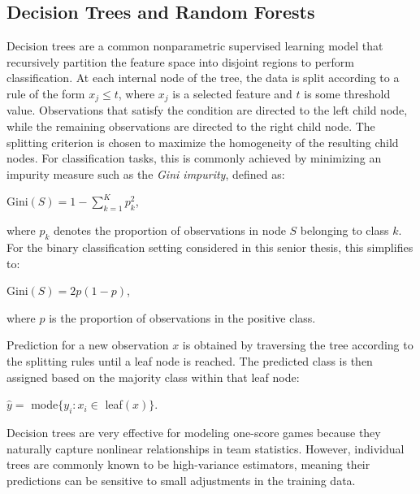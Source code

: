 \documentclass[11pt]{amsart}
\theoremstyle{definition}                  %
\theoremstyle{remark}                       %
\numberwithin{equation}{section}
\begin{document}
\subsection{Decision Trees and Random Forests}
Decision trees are a common nonparametric supervised learning model that recursively partition the feature space into disjoint regions to perform classification. At each internal node of the tree, the data is split according to a rule of the form $x_j \leq t$, where $x_j$ is a selected feature and $t$ is some threshold value. Observations that satisfy the condition are directed to the left child node, while the remaining observations are directed to the right child node. The splitting criterion is chosen to maximize the homogeneity of the resulting child nodes. For classification tasks, this is commonly achieved by minimizing an impurity measure such as the \textit{Gini impurity}, defined as:
\begin{center}
    Gini$(S) = 1 - \sum\limits_{k=1}^Kp_k^2$,
\end{center}
where $p_k$ denotes the proportion of observations in node $S$ belonging to class $k$. For the binary classification setting considered in this senior thesis, this simplifies to:
\begin{center}
    Gini$(S) = 2p(1-p)$,
\end{center}
where $p$ is the proportion of observations in the positive class.

Prediction for a new observation $x$ is obtained by traversing the tree according to the splitting rules until a leaf node is reached. The predicted class is then assigned based on the majority class within that leaf node:
\begin{center}
    $\hat{y} = $ mode$\{y_i: x_i \in $ leaf$(x)\}$.
\end{center}
Decision trees are very effective for modeling one-score games because they naturally capture nonlinear relationships in team statistics. However, individual trees are commonly known to be high-variance estimators, meaning their predictions can be sensitive to small adjustments in the training data. 
\end{document}
